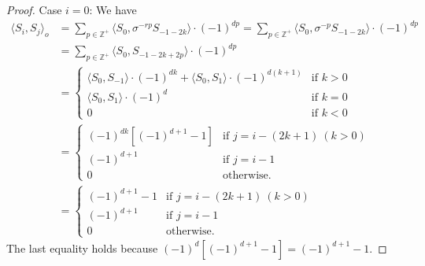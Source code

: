 \documentclass[reqno,12pt,a4paper]{amsart}
\theoremstyle{remark}
\theoremstyle{definition}
\numberwithin{equation}{section}
\begin{document}
\begin{proof}
Case $i=0$: We have
 \begin{align*}
  \langle S_i,S_j\rangle_o &=\sum_{p\in \mathbb{Z}^+}\langle S_0,\sigma^{-rp}S_{-1-2k}\rangle\cdot(-1)^{dp}=\sum_{p\in \mathbb{Z}^+}\langle S_0,\sigma^{-p}S_{-1-2k}\rangle\cdot(-1)^{dp}\\
&=\sum_{p\in \mathbb{Z}^+}\langle S_0,S_{-1-2k+2p}\rangle\cdot(-1)^{dp}\\
  &=\begin{cases}
    \langle S_0,S_{-1}\rangle\cdot(-1)^{dk}+\langle S_0,S_{1}\rangle\cdot(-1)^{d(k+1)} & \text{if }k>0\\
    \langle S_0,S_{1}\rangle\cdot(-1)^{d}& \text{if }k=0\\
    0 & \text{if }k<0
    \end{cases}\\
      &=
  \begin{cases}
    (-1)^{dk}[(-1)^{d+1}-1] & \text{if }j=i-(2k+1)~(k>0)\\
    (-1)^{d+1}& \text{if }j=i-1\\
    0 & \text{otherwise}.
    \end{cases}\\
  &=
  \begin{cases}
    (-1)^{d+1}-1 & \text{if }j=i-(2k+1)~(k>0)\\
    (-1)^{d+1}& \text{if }j=i-1\\
    0 & \text{otherwise}.
    \end{cases}
\end{align*}
The last equality holds because $(-1)^d[(-1)^{d+1}-1]=(-1)^{d+1}-1$.
\end{proof}
\end{document}
